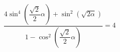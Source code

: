 \begin{ex}[type=prove_identity]
	\begin{condition}
		\( \dfrac{4\sin^4\left( \dfrac{\sqrt{2}}{2}\alpha \right)+\sin^2(\sqrt{2\alpha})}{1-\cos^2\left( \dfrac{\sqrt{2}}{2}\alpha \right)}=4 \)
	\end{condition}
\end{ex}